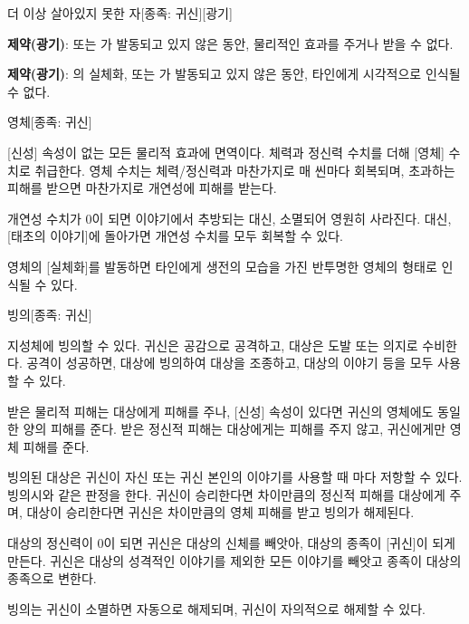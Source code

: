 \documentclass{report}
\begin{document}
	\begin{story}{더 이상 살아있지 못한 자}{[종족: 귀신][광기]}
		
		\textbf{제약(광기)}:  또는 가 발동되고 있지 않은 동안, 물리적인 효과를 주거나 받을 수 없다.
		
		\textbf{제약(광기)}: 의 실체화,  또는 가 발동되고 있지 않은 동안, 타인에게 시각적으로 인식될 수 없다.
		
	\end{story}
	
	\begin{story}{영체}{[종족: 귀신]}
		
		[신성] 속성이 없는 모든 물리적 효과에 면역이다. 체력과 정신력 수치를 더해 [영체] 수치로 취급한다. 영체 수치는 체력/정신력과 마찬가지로 매 씬마다 회복되며, 초과하는 피해를 받으면 마찬가지로 개연성에 피해를 받는다.
		
		개연성 수치가 0이 되면 이야기에서 추방되는 대신, 소멸되어 영원히 사라진다. 대신, [태초의 이야기]에 돌아가면 개연성 수치를 모두 회복할 수 있다.
		
		영체의 [실체화]를 발동하면 타인에게 생전의 모습을 가진 반투명한 영체의 형태로 인식될 수 있다.
		
	\end{story}
	
	\begin{story}{빙의}{[종족: 귀신]}
		
		지성체에 빙의할 수 있다. 귀신은 공감으로 공격하고, 대상은 도발 또는 의지로 수비한다. 공격이 성공하면, 대상에 빙의하여 대상을 조종하고, 대상의 이야기 등을 모두 사용할 수 있다.
		
		받은 물리적 피해는 대상에게 피해를 주나, [신성] 속성이 있다면 귀신의 영체에도 동일한 양의 피해를 준다. 받은 정신적 피해는 대상에게는 피해를 주지 않고, 귀신에게만 영체 피해를 준다.
		
		빙의된 대상은 귀신이 자신 또는 귀신 본인의 이야기를 사용할 때 마다 저항할 수 있다. 빙의시와 같은 판정을 한다. 귀신이 승리한다면 차이만큼의 정신적 피해를 대상에게 주며, 대상이 승리한다면 귀신은 차이만큼의 영체 피해를 받고 빙의가 해제된다.
		
		대상의 정신력이 0이 되면 귀신은 대상의 신체를 빼앗아, 대상의 종족이 [귀신]이 되게 만든다. 귀신은 대상의 성격적인 이야기를 제외한 모든 이야기를 빼앗고 종족이 대상의 종족으로 변한다.
		
		빙의는 귀신이 소멸하면 자동으로 해제되며, 귀신이 자의적으로 해제할 수 있다.
		
	\end{story}
	
\end{document}
